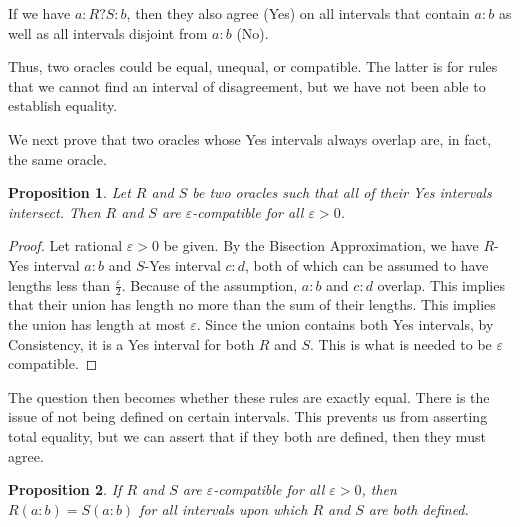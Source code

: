\documentclass[12pt]{article}
\newtheorem{proposition}{Proposition}[subsection]
\begin{document}
If we have $a:R?S:b$, then they also agree (Yes) on all intervals that contain $a:b$ as well as all intervals disjoint from $a:b$ (No). 

Thus, two oracles could be equal, unequal, or compatible. The latter is for rules that we cannot find an interval of disagreement, but we have not been able to establish equality. 

We next prove that two oracles whose Yes intervals always overlap are, in fact, the same oracle.

\begin{proposition}\label{pr:overlap}
Let $R$ and $S$ be two oracles such that all of their Yes intervals intersect. Then $R$ and $S$ are $\varepsilon$-compatible for all $\varepsilon > 0$.
\end{proposition}


\begin{proof}
Let rational $\varepsilon > 0$ be given. By the Bisection Approximation, we have $R$-Yes interval $a:b$ and $S$-Yes interval $c:d$, both of which can be assumed to have lengths less than $\frac{\varepsilon}{2}$. Because of the assumption, $a:b$ and $c:d$ overlap. This implies that their union has length no more than the sum of their lengths. This implies the union has length at most $\varepsilon$. Since the union contains both Yes intervals, by Consistency, it is a Yes interval for both $R$ and $S$. This is what is needed to be $\varepsilon$ compatible. 
\end{proof}

The question then becomes whether these rules are exactly equal. There is the issue of not being defined on certain intervals. This prevents us from asserting total equality, but we can assert that if they both are defined, then they must agree. 

\begin{proposition}\label{pr:epsilon-compatible}
If $R$ and $S$ are $\varepsilon$-compatible for all $\varepsilon > 0$, then $R(a:b)=S(a:b)$ for all intervals upon which $R$ and $S$ are both defined.
\end{proposition}
\end{document}
